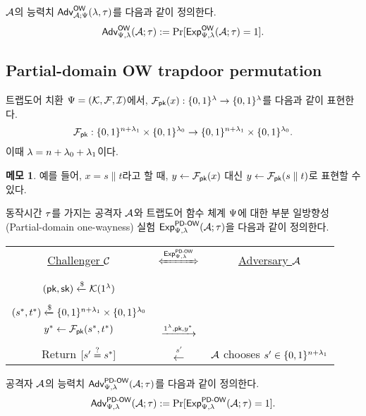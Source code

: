 \documentclass{article}
\theoremstyle{definition}
\newtheorem{memo}{메모}[section]
\begin{document}
$\mathcal{A}$의 능력치 $\textsf{Adv}^{\textsf{OW}}_{\mathcal{A};
\Psi}(\lambda, \tau)$를 다음과 같이 정의한다.
$$
	\textsf{Adv}^{\textsf{OW}}_{\Psi, \lambda}(\mathcal{A}; \tau) := \Pr[\textsf{Exp}^{\textsf{OW}}_{\Psi, \lambda}(\mathcal{A}; \tau) = 1].
$$

\subsection{Partial-domain OW trapdoor permutation}

트랩도어 치환 $\Psi = (\mathcal{K}, \mathcal{F}, \mathcal{I})$에서, $\mathcal{F}_{\textsf{pk}}(x):\{0, 1\}^{\lambda} \to
\{0, 1\}^{\lambda}$를 다음과 같이 표현한다.
$$
	\mathcal{F}_{\textsf{pk}}: \{0, 1\}^{n + \lambda_1} \times \{0, 1\}^{\lambda_0} \to \{0, 1\}^{n + \lambda_1} \times \{0, 1\}^{\lambda_0}.
$$
이때 $\lambda = n + \lambda_0 + \lambda_1$이다. 
\begin{memo}
	예를 들어, $x = s \parallel t$라고 할 때, $y \gets \mathcal{F}_{\textsf{pk}}(x)$ 대신 $y
	\gets \mathcal{F}_{\textsf{pk}}(s \parallel t)$로 표현할 수 있다.
\end{memo}
동작시간 $\tau$를 가지는 공격자 $\mathcal{A}$와 트랩도어 함수 체계 $\Psi$에 대한 부분
일방향성(Partial-domain one-wayness) 실험 $\textsf{Exp}^{\textsf{PD-OW}}_{\Psi, \lambda}(\mathcal{A};
\tau)$을 다음과 같이 정의한다.

\begin{tcolorbox}[colback=white]
	\centering
	\begin{tabularx}{\linewidth}{CcC}
		\underline{Challenger $\mathcal{C}$} & $\xLeftrightarrow{\Exp^{\owpd}_{\tdsch, \sp}}$ & \underline{Adversary $\mathcal{A}$} \\
		\\
		$(\textsf{pk}, \textsf{sk}) \xleftarrow{\$} \mathcal{K}(1^{\lambda})$ & & \\
		\\
		$(s^*, t^*) \xleftarrow{\$} \{0, 1\}^{n + \lambda_1} \times \{0, 1\}^{\lambda_0}$ \\ $y^* \gets \mathcal{F}_{\textsf{pk}}(s^*, t^*)$ & $\xrightarrow{1^{\lambda}, \textsf{pk}, y^*}$ & \\
		\\
		Return $[s' \overset{?}{=} s^*]$ & $\xleftarrow{s'}$ & $\mathcal{A}$ chooses $s' \in \{0, 1\}^{n + \lambda_1}$ \\
  \end{tabularx}
\end{tcolorbox}

공격자 $\mathcal{A}$의 능력치 $\textsf{Adv}^{\textsf{PD-OW}}_{\Psi, \lambda}(\mathcal{A}; \tau)$를 다음과 같이 정의한다.
$$
	\textsf{Adv}^{\textsf{PD-OW}}_{\Psi, \lambda}(\mathcal{A}; \tau) := \Pr[\textsf{Exp}^{\textsf{PD-OW}}_{\Psi, \lambda}(\mathcal{A}; \tau) = 1].
$$
\end{document}

